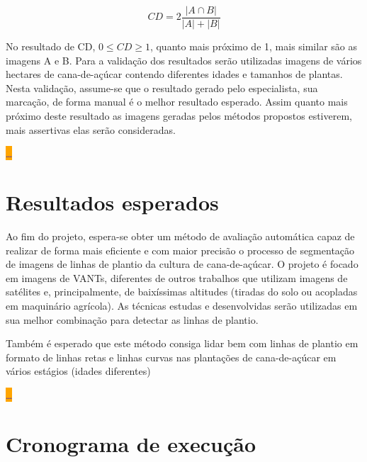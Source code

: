 \documentclass[12pt, a4paper, english, brazil]{article}
\newcommand{\dotsBlue}{\colorbox{orange}{\textcolor{blue}{\dots}}}
\begin{document}
\begin{equation}
    CD = 2 \frac{|A \cap B|}{|A| + |B|}
\end{equation}

No resultado de CD, $0 \le CD \ge 1$, quanto mais próximo de 1, mais similar são as imagens A e B. Para a validação dos resultados serão utilizadas imagens de vários hectares de cana-de-açúcar contendo diferentes idades e tamanhos de plantas. Nesta validação, assume-se que o resultado gerado pelo especialista, sua marcação, de forma manual é o melhor resultado esperado. Assim quanto mais próximo deste resultado as imagens geradas pelos métodos propostos estiverem, mais assertivas elas serão consideradas.

\dotsBlue

\section{Resultados esperados}

Ao fim do projeto, espera-se obter um método de avaliação automática capaz de realizar de forma mais eficiente e com maior precisão o processo de segmentação de imagens de linhas de plantio da cultura de cana-de-açúcar. O projeto é focado em imagens de VANTs, diferentes de outros trabalhos que utilizam imagens de satélites e, principalmente, de baixíssimas altitudes (tiradas do solo ou acopladas em maquinário agrícola). As técnicas estudas e desenvolvidas serão utilizadas em sua melhor combinação para detectar as linhas de plantio.

Também é esperado que este método consiga lidar bem com linhas de plantio em formato de linhas retas e linhas curvas nas plantações de cana-de-açúcar em vários estágios (idades diferentes)

\dotsBlue



\section{Cronograma de execução}
\end{document}
